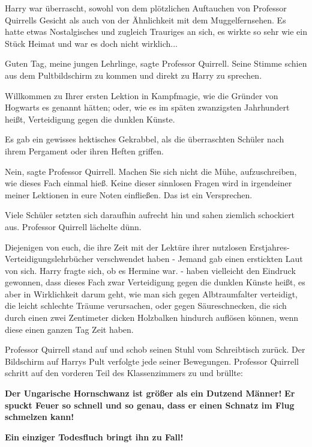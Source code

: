 Harry war überrascht, sowohl von dem plötzlichen Auftauchen von Professor
Quirrells Gesicht als auch von der Ähnlichkeit mit dem Muggelfernsehen. Es hatte
etwas Nostalgisches und zugleich Trauriges an sich, es wirkte so sehr wie ein
Stück Heimat und war es doch nicht wirklich...

\glqq Guten Tag, meine jungen Lehrlinge\grqq{}, sagte Professor Quirrell. Seine
Stimme schien aus dem Pultbildschirm zu kommen und direkt zu Harry zu sprechen.

\glqq Willkommen zu Ihrer ersten Lektion in Kampfmagie, wie die Gründer von
Hogwarts es genannt hätten; oder, wie es im späten zwanzigsten Jahrhundert
heißt, Verteidigung gegen die dunklen Künste.\grqq{}

Es gab ein gewisses hektisches Gekrabbel, als die überraschten Schüler nach
ihrem Pergament oder ihren Heften griffen.

\glqq Nein\grqq{}, sagte Professor Quirrell. \glqq Machen Sie sich nicht die
Mühe, aufzuschreiben, wie dieses Fach einmal hieß. Keine dieser sinnlosen Fragen
wird in irgendeiner meiner Lektionen in eure Noten einfließen. Das ist ein
Versprechen.\grqq{}

Viele Schüler setzten sich daraufhin aufrecht hin und sahen ziemlich schockiert
aus. Professor Quirrell lächelte dünn.

\glqq Diejenigen von euch, die ihre Zeit mit der Lektüre ihrer nutzlosen
Erstjahres-Verteidigungslehrbücher verschwendet haben -\grqq{} Jemand gab einen
erstickten Laut von sich. Harry fragte sich, ob es Hermine war. \glqq - haben
vielleicht den Eindruck gewonnen, dass dieses Fach zwar Verteidigung gegen die
dunklen Künste heißt, es aber in Wirklichkeit darum geht, wie man sich gegen
Albtraumfalter verteidigt, die leicht schlechte Träume verursachen, oder gegen
Säureschnecken, die sich durch einen zwei Zentimeter dicken Holzbalken hindurch
auflösen können, wenn diese einen ganzen Tag Zeit haben.\grqq{}

Professor Quirrell stand auf und schob seinen Stuhl vom Schreibtisch zurück. Der
Bildschirm auf Harrys Pult verfolgte jede seiner Bewegungen. Professor Quirrell
schritt auf den vorderen Teil des Klassenzimmers zu und brüllte:

\glqq \textbf{Der Ungarische Hornschwanz ist größer als ein Dutzend Männer!}
\textbf{Er spuckt Feuer so schnell und so genau, dass er einen Schnatz im Flug
schmelzen kann! }

\textbf{Ein einziger Todesfluch bringt ihn zu Fall!\grqq{} }

